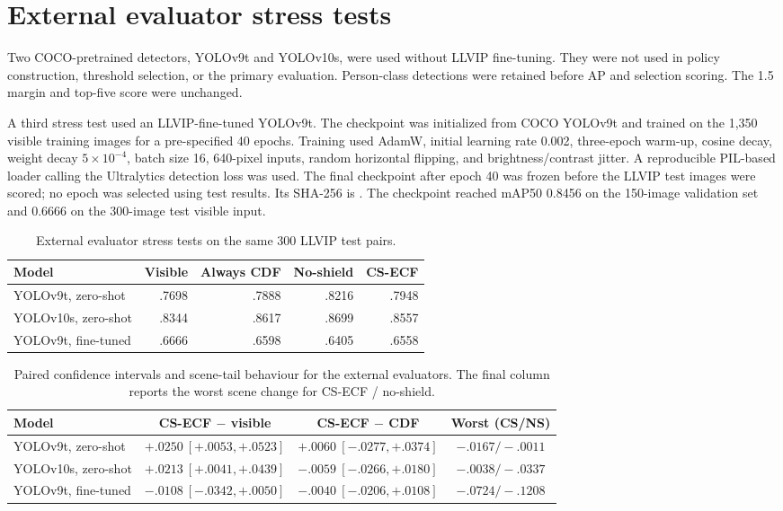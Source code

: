 \documentclass[11pt]{article}
\begin{document}
\section{External evaluator stress tests}

Two COCO-pretrained detectors, YOLOv9t and YOLOv10s, were used without LLVIP
fine-tuning. They were not used in policy construction, threshold selection, or
the primary evaluation. Person-class detections were retained before AP and
selection scoring. The 1.5 margin and top-five score were unchanged.

A third stress test used an LLVIP-fine-tuned YOLOv9t. The checkpoint was
initialized from COCO YOLOv9t and trained on the 1,350 visible training images
for a pre-specified 40 epochs. Training used AdamW, initial learning rate
0.002, three-epoch warm-up, cosine decay, weight decay \(5\times10^{-4}\), batch
size 16, 640-pixel inputs, random horizontal flipping, and
brightness/contrast jitter. A reproducible PIL-based loader calling the
Ultralytics detection loss was used. The final checkpoint after epoch 40 was
frozen before the LLVIP test images were scored; no epoch was selected using
test results. Its SHA-256 is
\texttt{}.
The checkpoint reached mAP50 0.8456 on the 150-image validation set and 0.6666
on the 300-image test visible input.

\begin{table}[ht]
\centering
\small
\caption{External evaluator stress tests on the same 300 LLVIP test pairs.}
\begin{tabular}{@{}lrrrr@{}}
\toprule
Model & Visible & Always CDF & No-shield & CS-ECF \\
\midrule
YOLOv9t, zero-shot & .7698 & .7888 & .8216 & .7948 \\
YOLOv10s, zero-shot & .8344 & .8617 & .8699 & .8557 \\
YOLOv9t, fine-tuned & .6666 & .6598 & .6405 & .6558 \\
\bottomrule
\end{tabular}
\end{table}

\begin{table}[ht]
\centering
\scriptsize
\setlength{\tabcolsep}{3pt}
\caption{Paired confidence intervals and scene-tail behaviour for the external
evaluators. The final column reports the worst scene change for CS-ECF /
no-shield.}
\begin{tabular}{@{}lccc@{}}
\toprule
Model & CS-ECF \(-\) visible & CS-ECF \(-\) CDF & Worst (CS/NS) \\
\midrule
YOLOv9t, zero-shot & \(+.0250~[+.0053,+.0523]\) &
  \(+.0060~[-.0277,+.0374]\) & \(-.0167 / -.0011\) \\
YOLOv10s, zero-shot & \(+.0213~[+.0041,+.0439]\) &
  \(-.0059~[-.0266,+.0180]\) & \(-.0038 / -.0337\) \\
YOLOv9t, fine-tuned & \(-.0108~[-.0342,+.0050]\) &
  \(-.0040~[-.0206,+.0108]\) & \(-.0724 / -.1208\) \\
\bottomrule
\end{tabular}
\end{table}
\end{document}
